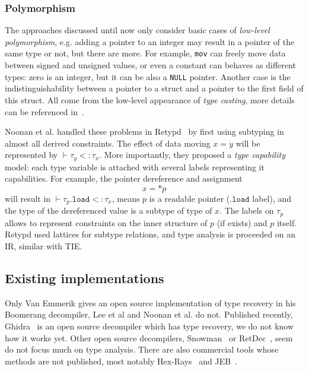 \documentclass[compsoc,conference,a4paper,10pt,times]{IEEEtran}
\begin{document}
\subsubsection*{Polymorphism}
The approaches discussed until now only consider basic cases of \emph{low-level polymorphism}, e.g.
adding a pointer to an integer may result in a pointer of the same type or not, but there are more.
For example, \texttt{mov} can freely move data between signed and unsigned values, or even a constant
can behaves as different types: zero is an integer, but it can be also a
\texttt{NULL} pointer. Another case is the indistinguishability between a pointer to a struct and
a pointer to the first field of this struct. All come from the low-level appearance of
\emph{type casting}, more details can be referenced in~\cite{siff_coping_1999}.

Noonan et al. handled these problems in Retypd~\cite{noonan_polymorphic_2016} by first
using subtyping in almost all derived constraints. The effect of data moving $x = y$ will be represented by
$\vdash \tau_{y} <\colon \tau_{x}$. More importantly, they proposed a
\emph{type capability} model: each type variable is attached with several labels representing it capabilities.
For example, the pointer dereference and assignment
\begin{equation*}
  x = *p
\end{equation*}
will result in $\vdash \tau_{p}.\mathtt{load} <\colon \tau_{x}$, means $p$ is a readable pointer
($\mathtt{.load}$ label), and
the type of the dereferenced value is a subtype of type of $x$. The labels on $\tau_{p}$ allows to
represent constraints on the inner structure of $p$ (if exists) and $p$ itself.
Retypd used lattices for subtype relations, and type analysis is proceeded on an IR, similar with TIE.

\subsection{Existing implementations}
Only Van Emmerik gives an open source implementation of type recovery in his Boomerang decompiler,
Lee et al and Noonan et al. do not. Published recently, Ghidra~\cite{noauthor_ghidra_nodate} is an
open source decompiler which has type recovery, we do not know how it works yet.
Other open source decompilers, Snowman~\cite{noauthor_snowman_nodate} or
RetDec~\cite{kroustek_retdec_2017}, seem do not focus much on type analysis.
There are also commercial tools whose methods are not published,
most notably Hex-Rays~\cite{noauthor_hex-rays_nodate} and JEB~\cite{noauthor_jeb_nodate}.
\end{document}
